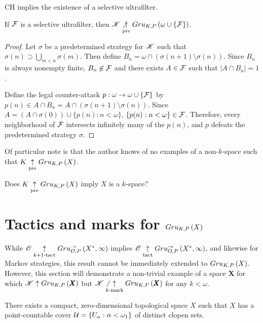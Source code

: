 \begin{thm}
  CH implies the existence of a selective ultrafilter.
  \cite{MR0080902}
\end{thm}

\begin{thm}
  If $\mathcal{F}$ is a selective ultrafilter, then
  $\mathscr{K}\not\underset{\text{pre}}{\uparrow} Gru_{K,P}\left({\omega\cup\{\mathcal{F}\}}\right)$.
\end{thm}

\begin{proof}
  Let $\sigma$ be a predetermined strategy for $\mathscr{K}$ such that
  $\sigma(n)\supset\bigcup_{m<n}\sigma(m)$.
  Then define $B_n=\omega\cap(\sigma(n+1)\setminus\sigma(n))$. Since $B_n$
  is always nonempty finite, $B_n\not\in\mathcal{F}$ and there exists $A\in \mathcal{F}$
  such that $|A\cap B_n|=1$.

  Define the legal counter-attack $p:\omega\to\omega\cup\{\mathcal{F}\}$ by
  $p(n)\in A\cap B_n=A\cap(\sigma(n+1)\setminus\sigma(n))$. Since
  $A=(A\cap\sigma(0))\cup\{p(n):n<\omega\}$, $\{p(n):n<\omega\}\in\mathcal{F}$.
  Therefore, every neighborhood of $\mathcal{F}$ intersects infinitely many of
  the $p(n)$, and $p$ defeats the predetermined strategy $\sigma$.
\end{proof}

Of particular note is that the author knows of no examples of a
non-$k$-space such that $K\underset{\text{pre}}{\uparrow}Gru_{K,P}\left({X}\right)$.

\begin{ques}
  Does $K\underset{\text{pre}}{\uparrow}Gru_{K,P}\left({X}\right)$ imply $X$ is a $k$-space?
\end{ques}


\section{Tactics and marks for $Gru_{K,P}\left({X}\right)$}

While $\mathscr{O}\underset{k+1\text{-tact}}{\uparrow}Gru_{O,P}^{\to}\left({X^*},{\infty}\right)$ implies
$\mathscr{O}\underset{\text{tact}}{\uparrow}Gru_{O,P}^{\to}\left({X^*},{\infty}\right)$, and likewise for Markov
strategies, this result cannot be
immediately extended to $Gru_{K,P}\left({X}\right)$. However, this section will
demonstrate a non-trivial example of a space $\pmb X$ for which
$\mathscr{K}\uparrow Gru_{K,P}\left({\pmb X}\right)$ but $\mathscr{K}\not\underset{k\text{-mark}}{\uparrow}Gru_{K,P}\left({\pmb X}\right)$
for any $k<\omega$.

\begin{thm}
  There exists a compact, zero-dimensional topological space $X$
  such that $X$ has a point-countable cover
  $\mathcal{U} = \{U_\alpha : \alpha<\omega_1\}$ of distinct clopen sets.
\end{thm}

